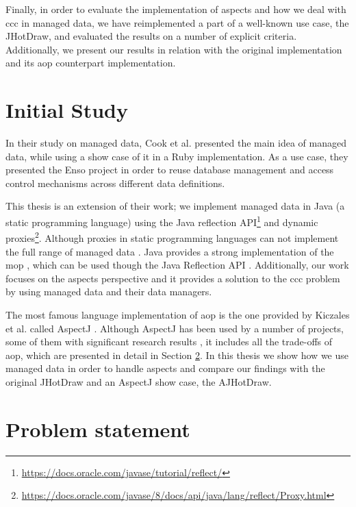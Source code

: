 Finally, in order to evaluate the implementation of aspects and how we deal with \ac{ccc} in managed data, we have reimplemented a part of a well-known use case, the JHotDraw, and evaluated the results on a number of explicit criteria.
Additionally, we present our results in relation with the original implementation and its \ac{aop} counterpart implementation.

\section{Initial Study}\label{Initial Study}
In their study on managed data, Cook et al. \cite{loh2012managed} presented the main idea of managed data, while using a show case of it in a Ruby implementation. 
As a use case, they presented the Enso project in order to reuse database management and  access control mechanisms across different data definitions.

This thesis is an extension of their work; we implement managed data in Java (a static programming language) using the Java reflection API\footnote{\url{https://docs.oracle.com/javase/tutorial/reflect/}} and dynamic proxies\footnote{\url{https://docs.oracle.com/javase/8/docs/api/java/lang/reflect/Proxy.html}}. 
Although proxies in static programming languages can not implement the full range of managed data \cite{loh2012managed}. 
Java provides a strong implementation of the \ac{mop} \cite{kiczales1991art}, which can be used though the Java Reflection API \cite{forman2004java}. 
Additionally, our work focuses on the aspects perspective and it provides a solution to the \ac{ccc} problem by using managed data and their data managers.

The most famous language implementation of \ac{aop} is the one provided by Kiczales et al. called AspectJ \cite{kiczales2001overview}. 
Although AspectJ has been used by a number of projects, some of them with significant research results \cite{hannemann2002design} \cite{marinajhotdraw}, it includes all the trade-offs of \ac{aop}, which are presented in detail in Section \ref{Problem statement}.
In this thesis we show how we use managed data in order to handle aspects and compare our findings with the original JHotDraw and an AspectJ show case, the AJHotDraw.

\section{Problem statement}\label{Problem statement}

